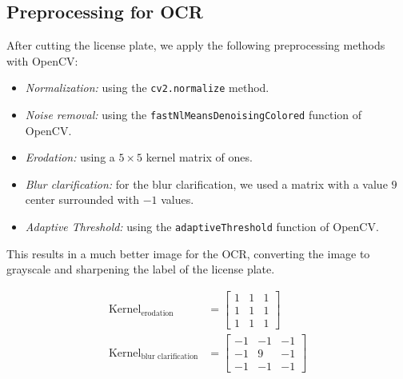\subsection{Preprocessing for OCR}

After cutting the license plate, we apply the following preprocessing methods
with OpenCV:
\begin{itemize}
    \item \emph{Normalization:} using the \texttt{cv2.normalize} method.
    \item \emph{Noise removal:} using the
        \texttt{fastNlMeansDenoisingColored} function of OpenCV.
    \item \emph{Erodation:} using a $5 \times 5$ kernel matrix of ones.
    \item \emph{Blur clarification:} for the blur clarification, we used a matrix
        with a value $9$ center surrounded with $-1$ values.
    \item \emph{Adaptive Threshold:} using the \texttt{adaptiveThreshold}
        function of OpenCV. 
\end{itemize}

This results in a much better image for the OCR, converting the image to
grayscale and sharpening the label of the license plate. 

\begin{align*}
    \text{Kernel}_{\text{erodation}}&= 
    \begin{bmatrix}
        1 & 1 & 1\\
        1 & 1 & 1 \\
        1 & 1 & 1
    \end{bmatrix}\\
    \text{Kernel}_{\text{blur clarification}}&= 
    \begin{bmatrix}
        -1 & -1 & -1\\
        -1 & 9  & -1 \\
        -1 & -1 & -1
    \end{bmatrix}
\end{align*}

